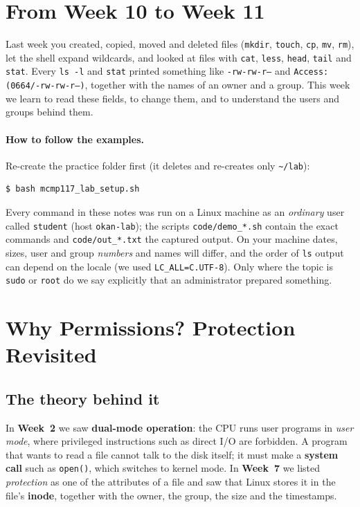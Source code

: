 \documentclass[11pt,a4paper]{article}
\newcommand{\term}[1]{\textbf{\color{mintdeep}#1}}
\newcommand{\cmd}[1]{\texttt{#1}}
\begin{document}
\setcounter{tocdepth}{1}
\tableofcontents

\section{From Week 10 to Week 11}

Last week you created, copied, moved and deleted files (\cmd{mkdir}, \cmd{touch}, \cmd{cp}, \cmd{mv}, \cmd{rm}), let the shell expand wildcards, and looked at files with \cmd{cat}, \cmd{less}, \cmd{head}, \cmd{tail} and \cmd{stat}. Every \cmd{ls -l} and \cmd{stat} printed something like \texttt{-rw-rw-r--} and \texttt{Access: (0664/-rw-rw-r--)}, together with the names of an owner and a group. This week we learn to read these fields, to change them, and to understand the users and groups behind them.

\paragraph{How to follow the examples.} Re-create the practice folder first (it deletes and re-creates only \texttt{\textasciitilde/lab}):
\begin{lstlisting}[style=term]
$ bash mcmp117_lab_setup.sh
\end{lstlisting}
Every command in these notes was run on a Linux machine as an \emph{ordinary} user called \texttt{student} (host \texttt{okan-lab}); the scripts \texttt{code/demo\_*.sh} contain the exact commands and \texttt{code/out\_*.txt} the captured output. On your machine dates, sizes, user and group \emph{numbers} and names will differ, and the order of \cmd{ls} output can depend on the locale (we used \texttt{LC\_ALL=C.UTF-8}). Only where the topic is \cmd{sudo} or \texttt{root} do we say explicitly that an administrator prepared something.

\section{Why Permissions? Protection Revisited}

\subsection{The theory behind it}

In \textbf{Week~2} we saw \term{dual-mode operation}: the CPU runs user programs in \emph{user mode}, where privileged instructions such as direct I/O are forbidden. A program that wants to read a file cannot talk to the disk itself; it must make a \term{system call} such as \cmd{open()}, which switches to kernel mode. In \textbf{Week~7} we listed \emph{protection} as one of the attributes of a file and saw that Linux stores it in the file's \term{inode}, together with the owner, the group, the size and the timestamps.
\end{document}
